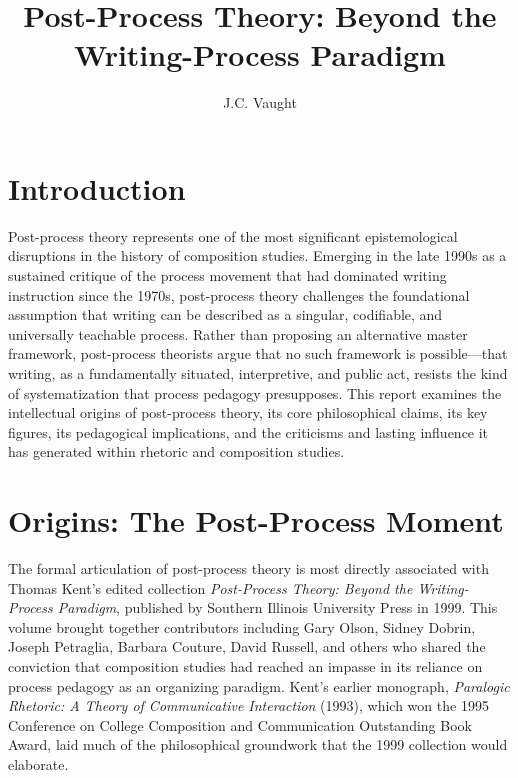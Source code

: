 \documentclass[12pt]{article}
\title{Post-Process Theory: Beyond the Writing-Process Paradigm}
\author{J.C. Vaught}
\date{}
\begin{document}
\maketitle

\section{Introduction}

Post-process theory represents one of the most significant epistemological disruptions in the history of composition studies. Emerging in the late 1990s as a sustained critique of the process movement that had dominated writing instruction since the 1970s, post-process theory challenges the foundational assumption that writing can be described as a singular, codifiable, and universally teachable process. Rather than proposing an alternative master framework, post-process theorists argue that no such framework is possible---that writing, as a fundamentally situated, interpretive, and public act, resists the kind of systematization that process pedagogy presupposes. This report examines the intellectual origins of post-process theory, its core philosophical claims, its key figures, its pedagogical implications, and the criticisms and lasting influence it has generated within rhetoric and composition studies.

\section{Origins: The Post-Process Moment}

The formal articulation of post-process theory is most directly associated with Thomas Kent's edited collection \textit{Post-Process Theory: Beyond the Writing-Process Paradigm}, published by Southern Illinois University Press in 1999. This volume brought together contributors including Gary Olson, Sidney Dobrin, Joseph Petraglia, Barbara Couture, David Russell, and others who shared the conviction that composition studies had reached an impasse in its reliance on process pedagogy as an organizing paradigm. Kent's earlier monograph, \textit{Paralogic Rhetoric: A Theory of Communicative Interaction} (1993), which won the 1995 Conference on College Composition and Communication Outstanding Book Award, laid much of the philosophical groundwork that the 1999 collection would elaborate.
\end{document}
